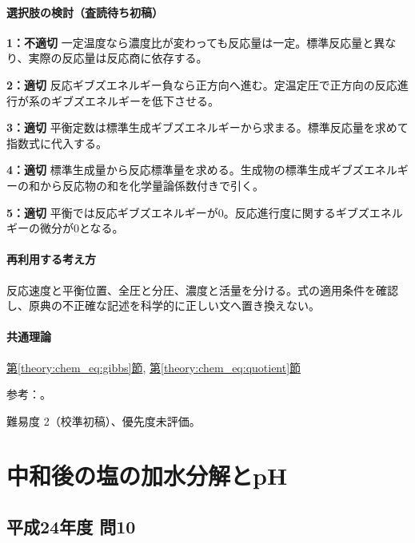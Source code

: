 \paragraph{選択肢の検討（査読待ち初稿）}\mbox{}\par

\noindent\textbf{1：不適切} 一定温度なら濃度比が変わっても反応量は一定。標準反応量と異なり、実際の反応量は反応商に依存する。\par

\noindent\textbf{2：適切} 反応ギブズエネルギー負なら正方向へ進む。定温定圧で正方向の反応進行が系のギブズエネルギーを低下させる。\par

\noindent\textbf{3：適切} 平衡定数は標準生成ギブズエネルギーから求まる。標準反応量を求めて指数式に代入する。\par

\noindent\textbf{4：適切} 標準生成量から反応標準量を求める。生成物の標準生成ギブズエネルギーの和から反応物の和を化学量論係数付きで引く。\par

\noindent\textbf{5：適切} 平衡では反応ギブズエネルギーが0。反応進行度に関するギブズエネルギーの微分が0となる。\par

\paragraph{再利用する考え方} 反応速度と平衡位置、全圧と分圧、濃度と活量を分ける。式の適用条件を確認し、原典の不正確な記述を科学的に正しい文へ置き換えない。

\paragraph{共通理論} \hyperref[theory:chem_eq:gibbs]{第\ref*{theory:chem_eq:gibbs}節}, \hyperref[theory:chem_eq:quotient]{第\ref*{theory:chem_eq:quotient}節}

\par 参考：\cite{iupac_greenbook2012}。

\par 難易度 2（校準初稿）、優先度未評価。

\section{中和後の塩の加水分解とpH}

\subsection{平成24年度 問10}
\label{q:h24-reg-applied-10}

